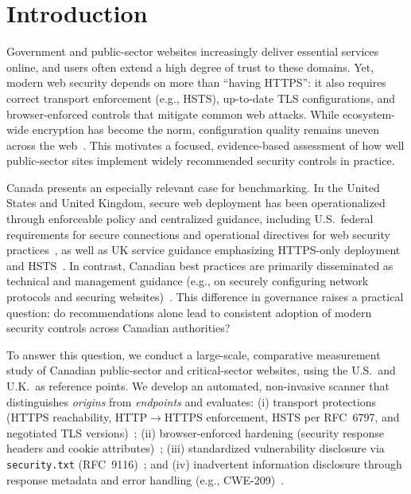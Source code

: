 \documentclass[conference]{IEEEtran}
\begin{document}
\section{Introduction}
  
  Government and public-sector websites increasingly deliver essential services online, and users often extend a high degree of trust to these domains. 
  Yet, modern web security depends on more than ``having HTTPS'': it also requires correct transport enforcement (e.g., HSTS), up-to-date TLS configurations, and browser-enforced controls that mitigate common web attacks. 
  While ecosystem-wide encryption has become the norm, configuration quality remains uneven across the web~\cite{GoogleTransparencyHTTPS,SSLPulse}. 
  This motivates a focused, evidence-based assessment of how well public-sector sites implement widely recommended security controls in practice.
  
  Canada presents an especially relevant case for benchmarking. 
  In the United States and United Kingdom, secure web deployment has been operationalized through enforceable policy and centralized guidance, including U.S.\ federal requirements for secure connections and operational directives for web security practices~\cite{omb-m-15-13,cisa_bod_18_01}, as well as UK service guidance emphasizing HTTPS-only deployment and HSTS~\cite{uk-using-https-service-manual}. 
  In contrast, Canadian best practices are primarily disseminated as technical and management guidance (e.g., on securely configuring network protocols and securing websites)~\cite{cccs-itsp-40062,cccs-itsm-60005}. 
  This difference in governance raises a practical question: do recommendations alone lead to consistent adoption of modern security controls across Canadian authorities?

  To answer this question, we conduct a large-scale, comparative measurement study of Canadian public-sector and critical-sector websites, using the U.S.\ and U.K.\ as reference points. 
  We develop an automated, non-invasive scanner that distinguishes \emph{origins} from \emph{endpoints} and evaluates: 
  (i) transport protections (HTTPS reachability, HTTP$\rightarrow$HTTPS enforcement, HSTS per RFC~6797, and negotiated TLS versions)~\cite{rfc6797}; 
  (ii) browser-enforced hardening (security response headers and cookie attributes)~\cite{owasp_http_security_response_headers}; 
  (iii) standardized vulnerability disclosure via \texttt{security.txt} (RFC~9116)~\cite{rfc9116}; and 
  (iv) inadvertent information disclosure through response metadata and error handling (e.g., CWE-209)~\cite{cwe_209}. 
  
\end{document}
